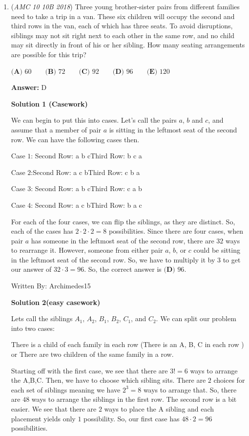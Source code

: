 \begin{enumerate}
	\item (\textit{AMC 10 10B 2018}) Three young brother-sister pairs from different families need to take a trip in a van. These six children will occupy the second and third rows in the van, each of which has three seats. To avoid disruptions, siblings may not sit right next to each other in the same row, and no child may sit directly in front of his or her sibling. How many seating arrangements are possible for this trip?


 $\textbf{(A) }60 \qquad \textbf{(B) }72 \qquad \textbf{(C) }92 \qquad \textbf{(D) }96 \qquad \textbf{(E) }120 \qquad$

 \textbf{Answer: }D



\textbf{Solution 1 (Casework)}

We can begin to put this into cases. Let's call the pairs $a$, $b$ and $c$, and assume that a member of pair $a$ is sitting in the leftmost seat of the second row. We can have the following cases then.

 Case $1$: Second Row: a b cThird Row: b c a

 Case $2$:Second Row: a c bThird Row: c b a

 Case $3$: Second Row: a b cThird Row: c a b

 Case $4$: Second Row: a c bThird Row: b a c

 For each of the four cases, we can flip the siblings, as they are distinct. So, each of the cases has $2 \cdot 2 \cdot 2 = 8$ possibilities. Since there are four cases, when pair $a$ has someone in the leftmost seat of the second row, there are $32$ ways to rearrange it. However, someone from either pair $a$, $b$, or $c$ could be sitting in the leftmost seat of the second row. So, we have to multiply it by $3$ to get our answer of $32 \cdot 3 = 96$. So, the correct answer is $\boxed{\textbf{(D)} \text{ 96}}$.

 Written By: Archimedes15

 



\textbf{Solution 2(easy casework)}

Lets call the siblings $A_1$, $A_2$, $B_1$, $B_2$, $C_1$, and $C_2$. We can split our problem into two cases:

 There is a child of each family in each row (There is an A, B, C in each row ) or There are two children of the same family in a row.

 Starting off with the first case, we see that there are $3!=6$ ways to arrange the A,B,C. Then, we have to choose which sibling sits. There are $2$ choices for each set of siblings meaning we have $2^3=8$ ways to arrange that. So, there are $48$ ways to arrange the siblings in the first row. The second row is a bit easier. We see that there are $2$ ways to place the A sibling and each placement yields only $1$ possibility. So, our first case has $48\cdot2=96$ possibilities.


\end{enumerate}
